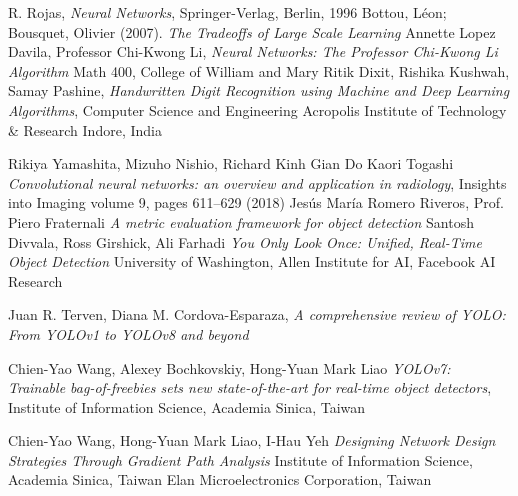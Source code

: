 \documentclass[12pt,a4paper,openright,twoside]{report}
\begin{document}
\begin{thebibliography}{90}             %
\rhead[\fancyplain{}{\bfseries \leftmark}]{\fancyplain{}{\bfseries
\thepage}}
 R. Rojas, \emph{Neural Networks}, Springer-Verlag, Berlin, 1996
 Bottou, Léon; Bousquet, Olivier (2007). \emph{The Tradeoffs of Large Scale Learning}
 Annette Lopez Davila, Professor Chi-Kwong Li, \emph{Neural Networks: The Professor Chi-Kwong Li Algorithm} Math 400, College of William and Mary
 Ritik Dixit, Rishika Kushwah, Samay Pashine, \emph{Handwritten Digit Recognition using Machine and Deep Learning Algorithms}, Computer Science and Engineering
Acropolis Institute of Technology \& Research
Indore, India

Rikiya Yamashita, Mizuho Nishio, Richard Kinh Gian Do Kaori Togashi \emph{Convolutional neural networks: an overview
and application in radiology}, Insights into Imaging volume 9, pages 611–629 (2018)
 Jesús María Romero Riveros, Prof. Piero Fraternali \emph{A metric evaluation framework for object detection}
  Santosh Divvala, Ross Girshick, Ali Farhadi \emph{You Only Look Once: Unified, Real-Time Object Detection} University of Washington, Allen Institute for AI, Facebook AI Research

 Juan R. Terven, Diana M. Cordova-Esparaza, \emph{A comprehensive review of YOLO: From YOLOv1 to YOLOv8 and beyond}

Chien-Yao Wang, Alexey Bochkovskiy, Hong-Yuan Mark Liao \emph{YOLOv7: Trainable bag-of-freebies sets new state-of-the-art for real-time object
detectors}, Institute of Information Science, Academia Sinica, Taiwan

Chien-Yao Wang, Hong-Yuan Mark Liao, I-Hau Yeh \emph{Designing Network Design Strategies Through Gradient Path Analysis}
Institute of Information Science, Academia Sinica, Taiwan Elan Microelectronics Corporation, Taiwan


\end{thebibliography}
\end{document}
